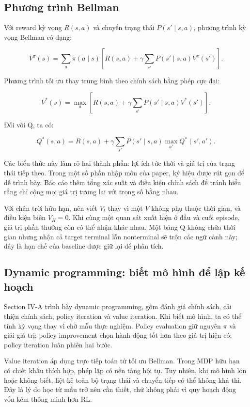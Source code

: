 \subsection{Phương trình Bellman}\label{phux1b0ux1a1ng-truxecnh-bellman}

Với reward kỳ vọng \(R(s,a)\) và chuyển trạng thái \(P(s'\mid s,a)\),
phương trình kỳ vọng Bellman có dạng:

\[V^\pi(s)=\sum_a\pi(a\mid s)\left[R(s,a)+\gamma\sum_{s'}P(s'\mid s,a)V^\pi(s')\right].\]

Phương trình tối ưu thay trung bình theo chính sách bằng phép cực đại:

\[V^*(s)=\max_a\left[R(s,a)+\gamma\sum_{s'}P(s'\mid s,a)V^*(s')\right].\]

Đối với Q, ta có:

\[Q^*(s,a)=R(s,a)+\gamma\sum_{s'}P(s'\mid s,a)\max_{a'}Q^*(s',a').\]

Các biểu thức này làm rõ hai thành phần: lợi ích tức thời và giá trị của
trạng thái tiếp theo. Trong một số phần nhập môn của paper, ký hiệu được
rút gọn để dễ trình bày. Báo cáo thêm tổng xác suất và điều kiện chính
sách để tránh hiểu rằng chỉ cộng mọi giá trị tương lai với trọng số bằng
nhau.

Với chân trời hữu hạn, nên viết \(V_t\) thay vì một \(V\) không phụ
thuộc thời gian, và điều kiện biên \(V_H=0\). Khi cùng một quan sát xuất
hiện ở đầu và cuối episode, giá trị phần thưởng còn có thể nhận khác
nhau. Một bảng Q không chứa thời gian nhưng nhận cả target terminal lẫn
nonterminal sẽ trộn các ngữ cảnh này; đây là hạn chế của baseline được
giữ lại để phân tích.

\subsection{Dynamic programming: biết mô hình để lập kế
hoạch}\label{dynamic-programming-biux1ebft-muxf4-huxecnh-ux111ux1ec3-lux1eadp-kux1ebf-houx1ea1ch}

Section IV-A trình bày dynamic programming, gồm đánh giá chính sách, cải
thiện chính sách, policy iteration và value iteration. Khi biết mô hình,
ta có thể tính kỳ vọng thay vì chờ mẫu thực nghiệm. Policy evaluation
giữ nguyên \(\pi\) và giải giá trị; policy improvement chọn hành động
tốt hơn theo giá trị hiện có; policy iteration luân phiên hai bước.

Value iteration áp dụng trực tiếp toán tử tối ưu Bellman. Trong MDP hữu
hạn có chiết khấu thích hợp, phép lặp có nền tảng hội tụ. Tuy nhiên, khi
mô hình lớn hoặc không biết, liệt kê toàn bộ trạng thái và chuyển tiếp
có thể không khả thi. Đây là lý do học từ mẫu trở nên cần thiết, chứ
không phải vì quy hoạch động vốn kém thông minh hơn RL.

